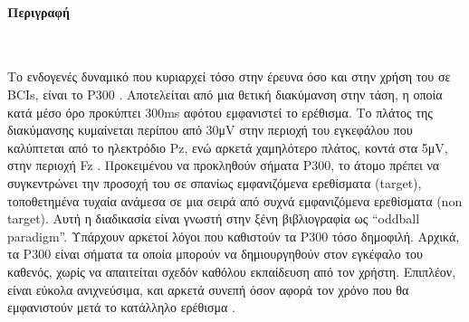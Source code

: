 \documentclass[11pt,a4paper,english,greek,twoside]{../Thesis}
\begin{document}
      \paragraph{Περιγραφή} ~\\
      \par Το ενδογενές δυναμικό που κυριαρχεί τόσο στην έρευνα όσο και στην χρήση του σε BCIs, είναι το P300 \cite{Gordeev2007-pu}. Αποτελείται από μια θετική διακύμανση στην τάση, η οποία κατά μέσο όρο προκύπτει 300ms αφότου εμφανιστεί το ερέθισμα. Το πλάτος της διακύμανσης κυμαίνεται περίπου από 30μV στην περιοχή του εγκεφάλου που καλύπτεται από το ηλεκτρόδιο Pz, ενώ αρκετά χαμηλότερο πλάτος, κοντά στα 5μV, στην περιοχή Fz \cite{Perlman2013-sg}. Προκειμένου να προκληθούν σήματα P300, το άτομο πρέπει να συγκεντρώνει την προσοχή του σε σπανίως εμφανιζόμενα ερεθίσματα (target), τοποθετημένα τυχαία ανάμεσα σε μια σειρά από συχνά εμφανιζόμενα ερεθίσματα (non target). Αυτή η διαδικασία είναι γνωστή στην ξένη βιβλιογραφία ως “oddball paradigm”. Υπάρχουν αρκετοί λόγοι που καθιστούν τα P300 τόσο δημοφιλή. Αρχικά, τα P300 είναι σήματα τα οποία μπορούν να δημιουργηθούν στον εγκέφαλο του καθενός, χωρίς να απαιτείται σχεδόν καθόλου εκπαίδευση από τον χρήστη. Επιπλέον, είναι εύκολα ανιχνεύσιμα, και αρκετά συνεπή όσον αφορά τον χρόνο που θα εμφανιστούν μετά το κατάλληλο ερέθισμα \cite{Fazel-Rezai2012-mk}. 
      
\end{document}

